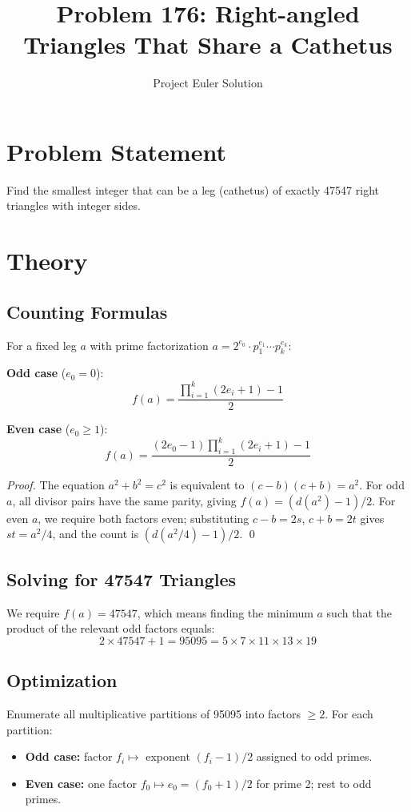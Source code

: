 \documentclass[12pt]{article}
\title{Problem 176: Right-angled Triangles That Share a Cathetus}
\author{Project Euler Solution}
\date{}
\begin{document}
\maketitle

\section{Problem Statement}
Find the smallest integer that can be a leg (cathetus) of exactly 47547 right triangles with integer sides.

\section{Theory}

\subsection{Counting Formulas}

For a fixed leg $a$ with prime factorization $a = 2^{e_0} \cdot p_1^{e_1} \cdots p_k^{e_k}$:

\textbf{Odd case} ($e_0 = 0$):
\[
f(a) = \frac{\prod_{i=1}^k (2e_i + 1) - 1}{2}
\]

\textbf{Even case} ($e_0 \geq 1$):
\[
f(a) = \frac{(2e_0 - 1) \prod_{i=1}^k (2e_i + 1) - 1}{2}
\]

\textit{Proof.} The equation $a^2 + b^2 = c^2$ is equivalent to $(c-b)(c+b) = a^2$.
For odd $a$, all divisor pairs have the same parity, giving $f(a) = (d(a^2) - 1)/2$.
For even $a$, we require both factors even; substituting $c - b = 2s$, $c + b = 2t$ gives $st = a^2/4$, and the count is $(d(a^2/4) - 1)/2$. \qed

\subsection{Solving for 47547 Triangles}

We require $f(a) = 47547$, which means finding the minimum $a$ such that the product of the relevant odd factors equals:
\[
2 \times 47547 + 1 = 95095 = 5 \times 7 \times 11 \times 13 \times 19
\]

\subsection{Optimization}

Enumerate all multiplicative partitions of 95095 into factors $\geq 2$. For each partition:
\begin{itemize}
\item \textbf{Odd case:} factor $f_i \mapsto$ exponent $(f_i - 1)/2$ assigned to odd primes.
\item \textbf{Even case:} one factor $f_0 \mapsto e_0 = (f_0 + 1)/2$ for prime 2; rest to odd primes.
\end{itemize}
\end{document}
